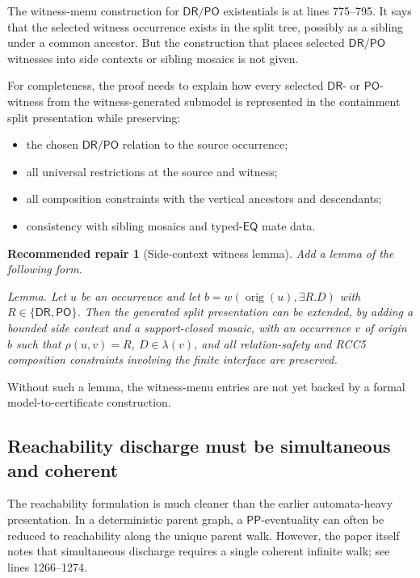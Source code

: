 \documentclass[11pt]{article}
\newcommand{\PP}{\mathsf{PP}}
\newcommand{\PO}{\mathsf{PO}}
\newcommand{\DR}{\mathsf{DR}}
\newcommand{\EQ}{\mathsf{EQ}}
\newcommand{\orig}{\operatorname{orig}}
\newtheorem{recommendation}{Recommended repair}
\begin{document}
The witness-menu construction for \(\DR/\PO\) existentials is at lines 775--795.
It says that the selected witness occurrence exists in the split tree, possibly
as a sibling under a common ancestor.  But the construction that places selected
\(\DR/\PO\) witnesses into side contexts or sibling mosaics is not given.

For completeness, the proof needs to explain how every selected \(\DR\)- or
\(\PO\)-witness from the witness-generated submodel is represented in the
containment split presentation while preserving:
\begin{itemize}[leftmargin=2em]
\item the chosen \(\DR/\PO\) relation to the source occurrence;
\item all universal restrictions at the source and witness;
\item all composition constraints with the vertical ancestors and descendants;
\item consistency with sibling mosaics and typed-\(\EQ\) mate data.
\end{itemize}

\begin{recommendation}[Side-context witness lemma]
Add a lemma of the following form.

\medskip
\noindent\emph{Lemma.}  Let \(u\) be an occurrence and let
\(b=w(\orig(u),\exists R.D)\) with \(R\in\{\DR,\PO\}\).  Then the generated split
presentation can be extended, by adding a bounded side context and a
support-closed mosaic, with an occurrence \(v\) of origin \(b\) such that
\(\rho(u,v)=R\), \(D\in\lambda(v)\), and all relation-safety and RCC5 composition
constraints involving the finite interface are preserved.
\end{recommendation}

Without such a lemma, the witness-menu entries are not yet backed by a formal
model-to-certificate construction.

\subsection{Reachability discharge must be simultaneous and coherent}

The reachability formulation is much cleaner than the earlier automata-heavy
presentation.  In a deterministic parent graph, a \(\PP\)-eventuality can often
be reduced to reachability along the unique parent walk.  However, the paper
itself notes that simultaneous discharge requires a single coherent infinite
walk; see lines 1266--1274.
\end{document}
